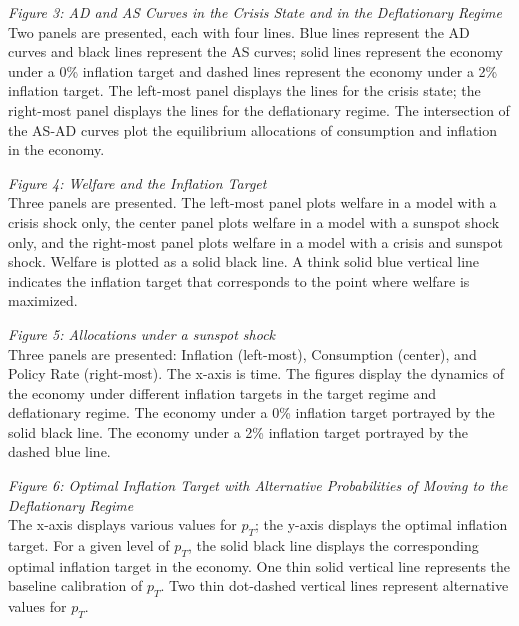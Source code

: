 \documentclass[11pt]{article}
\begin{document}
	\noindent \emph{Figure 3: AD and AS Curves in the Crisis State and in the Deflationary Regime}\\
	\noindent Two panels are presented, each with four lines. Blue lines represent the AD curves and black lines represent the AS curves; solid lines represent the economy under a 0\% inflation target and dashed lines represent the economy under a 2\% inflation target. The left-most panel displays the lines for the crisis state; the right-most panel displays the lines for the deflationary regime. The intersection of the AS-AD curves plot the equilibrium allocations of consumption and inflation in the economy.  \vspace{0.5cm}
	
	\noindent \emph{Figure 4: Welfare and the Inflation Target}\\
	\noindent Three panels are presented. The left-most panel plots welfare in a model with a crisis shock only, the center panel plots welfare in a model with a sunspot shock only, and the right-most panel plots welfare in a model with a crisis and sunspot shock. Welfare is plotted as a solid black line. A think solid blue vertical line indicates the inflation target that corresponds to the point where welfare is maximized. \vspace{0.5cm}
	
	\noindent \emph{Figure 5: Allocations under a sunspot shock}\\
	\noindent Three panels are presented: Inflation (left-most), Consumption (center), and Policy Rate (right-most). The x-axis is time. The figures display the dynamics of the economy under different inflation targets in the target regime and deflationary regime. The economy under a 0\% inflation target portrayed by the solid black line. The economy under a 2\% inflation target portrayed by the dashed blue line.\vspace{0.5cm}
	
	\noindent \emph{Figure 6: Optimal Inflation Target with Alternative Probabilities of Moving to the Deflationary Regime }\\
	\noindent The x-axis displays various values for $p_T$; the y-axis displays the optimal inflation target. For a given level of $p_T$, the solid black line displays the corresponding optimal inflation target in the economy. One thin solid vertical line represents the baseline calibration of $p_T$. Two thin dot-dashed vertical lines represent alternative values for $p_T$.\vspace{0.5cm}
	
\end{document}
